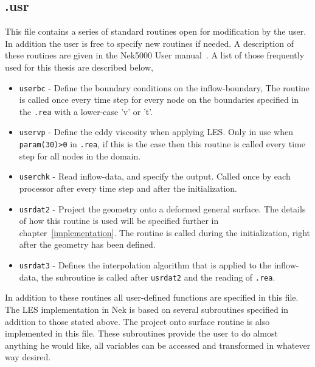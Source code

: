 \subsection{.usr}
This file contains a series of standard routines open for modification by the user. In addition the user is free to specify 
new routines if needed. A description of these routines are given in the Nek5000 User manual~\cite{Nek}. A list of those 
frequently used for this thesis are described below, 
%
%
\begin{itemize}
    \item \verb|userbc| - Define the boundary conditions on the inflow-boundary, The routine is called once every time step 
        for every node on the boundaries specified in the \verb|.rea| with a lower-case 'v' or 't'.
    \item \verb|uservp| - Define the eddy viscosity when applying LES. Only in use when 
        \verb|param(30)>0| in \verb|.rea|, if this is the case 
        then this routine is called every time step for all nodes in the domain.
    \item \verb|userchk| - Read inflow-data, and specify the output. Called once by each
        processor after every time step and after the initialization.
    \item \verb|usrdat2| - Project the geometry onto a deformed general surface. The details of how this routine is used will be 
    specified further in chapter~\ref{implementation}. The routine is called during the initialization, right after the geometry 
    has been defined.
    \item \verb|usrdat3| - Defines the interpolation algorithm that is applied to the inflow-data, the subroutine is called 
        after \verb|usrdat2| and the reading of \verb|.rea|.
\end{itemize}
%
In addition to these routines all user-defined functions are specified in this file. The LES implementation in Nek is based
on several subroutines specified in addition to those stated above. The project onto surface routine is also implemented 
in this file. These subroutines provide the user to do almost anything he would like, all variables
can be accessed and transformed in whatever way desired. 

